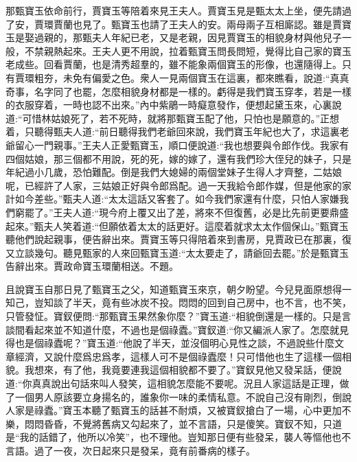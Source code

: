 \begin{parag}
    那甄寶玉依命前行，賈寶玉等陪着來見王夫人。賈寶玉見是甄太太上坐，便先請過了安，賈環賈蘭也見了。甄寶玉也請了王夫人的安。兩母兩子互相廝認。雖是賈寶玉是娶過親的，那甄夫人年紀已老，又是老親，因見賈寶玉的相貌身材與他兒子一般，不禁親熱起來。王夫人更不用說，拉着甄寶玉問長問短，覺得比自己家的寶玉老成些。回看賈蘭，也是清秀超羣的，雖不能象兩個寶玉的形像，也還隨得上。只有賈環粗夯，未免有偏愛之色。衆人一見兩個寶玉在這裏，都來瞧看，說道:“真真奇事，名字同了也罷，怎麼相貌身材都是一樣的。虧得是我們寶玉穿孝，若是一樣的衣服穿着，一時也認不出來。”內中紫鵑一時癡意發作，便想起黛玉來，心裏說道:“可惜林姑娘死了，若不死時，就將那甄寶玉配了他，只怕也是願意的。”正想着，只聽得甄夫人道:“前日聽得我們老爺回來說，我們寶玉年紀也大了，求這裏老爺留心一門親事。”王夫人正愛甄寶玉，順口便說道:“我也想要與令郎作伐。我家有四個姑娘，那三個都不用說，死的死，嫁的嫁了，還有我們珍大侄兒的妹子，只是年紀過小几歲，恐怕難配。倒是我們大媳婦的兩個堂妹子生得人才齊整，二姑娘呢，已經許了人家，三姑娘正好與令郎爲配。過一天我給令郎作媒，但是他家的家計如今差些。”甄夫人道:“太太這話又客套了。如今我們家還有什麼，只怕人家嫌我們窮罷了。”王夫人道:“現今府上覆又出了差，將來不但復舊，必是比先前更要鼎盛起來。”甄夫人笑着道:“但願依着太太的話更好。這麼着就求太太作個保山。”甄寶玉聽他們說起親事，便告辭出來。賈寶玉等只得陪着來到書房，見賈政已在那裏，復又立談幾句。聽見甄家的人來回甄寶玉道:“太太要走了，請爺回去罷。”於是甄寶玉告辭出來。賈政命寶玉環蘭相送。不題。
\end{parag}


\begin{parag}
    且說寶玉自那日見了甄寶玉之父，知道甄寶玉來京，朝夕盼望。今兒見面原想得一知己，豈知談了半天，竟有些冰炭不投。悶悶的回到自己房中，也不言，也不笑，只管發怔。寶釵便問:“那甄寶玉果然象你麼？”寶玉道:“相貌倒還是一樣的。只是言談間看起來並不知道什麼，不過也是個祿蠹。”寶釵道:“你又編派人家了。怎麼就見得也是個祿蠹呢？”寶玉道:“他說了半天，並沒個明心見性之談，不過說些什麼文章經濟，又說什麼爲忠爲孝，這樣人可不是個祿蠹麼！只可惜他也生了這樣一個相貌。我想來，有了他，我竟要連我這個相貌都不要了。”寶釵見他又發呆話，便說道:“你真真說出句話來叫人發笑，這相貌怎麼能不要呢。況且人家這話是正理，做了一個男人原該要立身揚名的，誰象你一味的柔情私意。不說自己沒有剛烈，倒說人家是祿蠹。”寶玉本聽了甄寶玉的話甚不耐煩，又被寶釵搶白了一場，心中更加不樂，悶悶昏昏，不覺將舊病又勾起來了，並不言語，只是傻笑。寶釵不知，只道是“我的話錯了，他所以冷笑”，也不理他。豈知那日便有些發呆，襲人等慪他也不言語。過了一夜，次日起來只是發呆，竟有前番病的樣子。
\end{parag}



